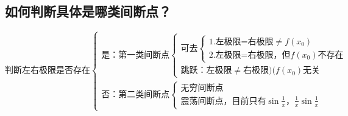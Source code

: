 \documentclass[a4paper,11pt]{book}
\begin{document}
\subsection*{如何判断具体是哪类间断点？}

\vspace{5ex}

\[
\text{判断左右极限是否存在}
\begin{cases}
        \text{是：第一类间断点}
        \begin{cases}
            \text{可去}
                \begin{cases}
                    1.\text{左极限=右极限}\ne f(x_{0})\\
                    2.\text{左极限=右极限，但}f(x_{0})\text{不存在}
                \end{cases}\\
            \text{跳跃：左极限}\ne \text{右极限)}(f(x_{0})\text{无关}
        \end{cases}\\
        \text{否：第二类间断点}
        \begin{cases}
            \text{无穷间断点}\\
            \text{震荡间断点，目前只有}\sin\frac{1}{x}，\frac{1}{x}\sin \frac{1}{x}
        \end{cases}
\end{cases}
\]
\end{document}
